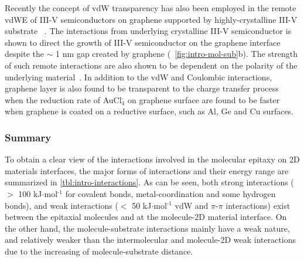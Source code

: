 %
Recently the concept of vdW transparency has also been
employed in the remote vdWE of III-V semiconductors on graphene supported by highly-crystalline III-V substrate
~\cite{Kim_2017_remote_epi_Gr,Kong_2018_vdw_polar}.
%
The interactions from underlying crystalline III-V semiconductor is
shown to direct the growth of III-V semiconductor on the graphene
interface despite the $\sim{}$ 1 nm gap created by graphene (~\autoref{fig:intro-mol-sub}b). The
strength of such remote interactions are also shown to be dependent on
the polarity of the underlying material~\cite{Kong_2018_vdw_polar}.
%
In addition to the vdW and Coulombic interactions,
graphene layer is also found to be transparent to the charge transfer
process ~\cite{Jeong_2015_DA_transparency_gr} when the reduction rate of
AuCl\(_{\text{4}}^{\text{-}}\) on graphene surface are found to be
faster when graphene is coated on a reductive surface, such as Al, Ge
and Cu surfaces. 


\subsubsection{Summary}
\label{sec:org697d552}

To obtain a clear view of the interactions involved in the molecular
epitaxy on 2D materials interfaces, the major forms
of interactions and their energy range are summarized in
\autoref{tbl:intro-interactions}. As can be seen, both strong interactions ($>$ 100
kJ\(\cdot\)mol\(^{\text{-1}}\) for covalent bonds, metal-coordination and some
hydrogen bonds), and weak interactions ($<$ 50 kJ\(\cdot\)mol\(^{\text{-1}}\) vdW
and \(\pi\)-\(\pi\) interactions) exist between the epitaxial molecules and at
the molecule-2D material interface. On the other hand, the
molecule-substrate interactions mainly have a weak nature, and
relatively weaker than the intermolecular and molecule-2D weak
interactions due to the increasing of molecule-substrate distance.

